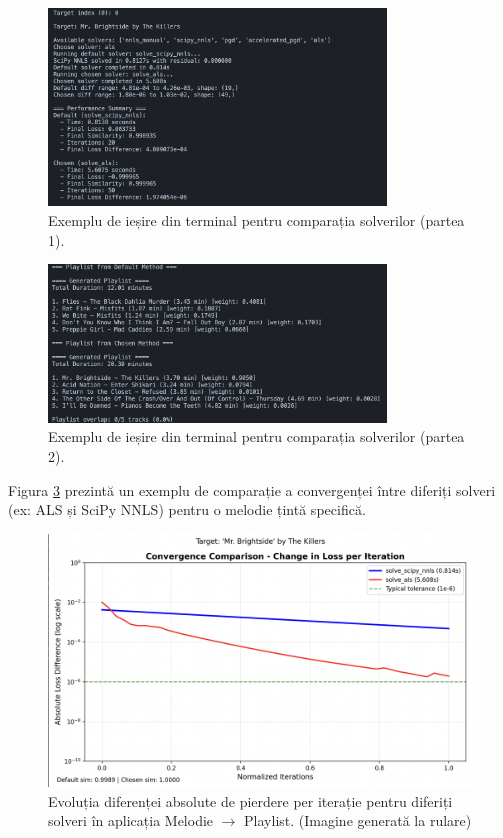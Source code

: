 \documentclass[12pt,a4paper]{article}
\begin{document}
	\begin{figure}[htbp]
		\centering
		\includegraphics[width=0.8\textwidth]{Data1.png} %
		\caption{Exemplu de ieșire din terminal pentru comparația solverilor (partea 1).}
		\label{fig:output_solver_1}
	\end{figure}

	\begin{figure}[htbp]
		\centering
		\includegraphics[width=0.8\textwidth]{Data2.png} %
		\caption{Exemplu de ieșire din terminal pentru comparația solverilor (partea 2).}
		\label{fig:output_solver_2}
	\end{figure}

	Figura \ref{fig:song_to_playlist_convergence} prezintă un exemplu de comparație a convergenței între diferiți solveri (ex: ALS și SciPy NNLS) pentru o melodie țintă specifică.

	\begin{figure}[htbp]
		\centering
\includegraphics[width=1.0\textwidth]{Als.png}
		\caption{Evoluția diferenței absolute de pierdere per iterație pentru diferiți solveri în aplicația Melodie $\rightarrow$ Playlist. (Imagine generată la rulare)}
		\label{fig:song_to_playlist_convergence}
	\end{figure}
\end{document}
